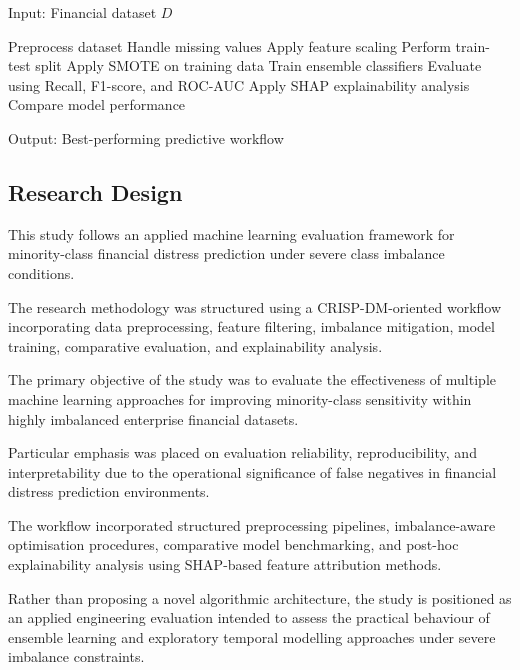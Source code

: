 \documentclass{article}
\begin{document}
\begin{algorithm}
\caption{Imbalance-Aware Financial Distress Prediction Workflow}

\begin{algorithmic}[1]

\State Input: Financial dataset \(D\)

\State Preprocess dataset
\State Handle missing values
\State Apply feature scaling
\State Perform train-test split
\State Apply SMOTE on training data
\State Train ensemble classifiers
\State Evaluate using Recall, F1-score, and ROC-AUC
\State Apply SHAP explainability analysis
\State Compare model performance

\State Output: Best-performing predictive workflow

\end{algorithmic}
\end{algorithm}

\subsection{Research Design}

This study follows an applied machine learning evaluation framework for minority-class financial distress prediction under severe class imbalance conditions.

The research methodology was structured using a CRISP-DM-oriented workflow incorporating data preprocessing, feature filtering, imbalance mitigation, model training, comparative evaluation, and explainability analysis.

The primary objective of the study was to evaluate the effectiveness of multiple machine learning approaches for improving minority-class sensitivity within highly imbalanced enterprise financial datasets.

Particular emphasis was placed on evaluation reliability, reproducibility, and interpretability due to the operational significance of false negatives in financial distress prediction environments.

The workflow incorporated structured preprocessing pipelines, imbalance-aware optimisation procedures, comparative model benchmarking, and post-hoc explainability analysis using SHAP-based feature attribution methods.

Rather than proposing a novel algorithmic architecture, the study is positioned as an applied engineering evaluation intended to assess the practical behaviour of ensemble learning and exploratory temporal modelling approaches under severe imbalance constraints.
\end{document}
